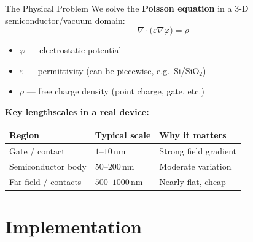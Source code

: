 \documentclass[aspectratio=169]{beamer}
\begin{document}
\begin{frame}{The Physical Problem}
  We solve the \textbf{Poisson equation} in a 3-D semiconductor/vacuum domain:
  \[
    -\nabla \cdot \bigl(\varepsilon \nabla \varphi\bigr) = \rho
  \]
  \begin{itemize}
    \item $\varphi$ — electrostatic potential
    \item $\varepsilon$ — permittivity (can be piecewise, e.g.\ Si/SiO$_2$)
    \item $\rho$ — free charge density (point charge, gate, etc.)
  \end{itemize}

  \vspace{0.6em}
  \textbf{Key lengthscales in a real device:}

  \begin{center}
  \begin{tabular}{lll}
    \toprule
    Region & Typical scale & Why it matters \\
    \midrule
    Gate / contact & $1$--$10$\,nm & Strong field gradient \\
    Semiconductor body & $50$--$200$\,nm & Moderate variation \\
    Far-field / contacts & $500$--$1000$\,nm & Nearly flat, cheap \\
    \bottomrule
  \end{tabular}
  \end{center}
\end{frame}

\section{Implementation}
\end{document}
